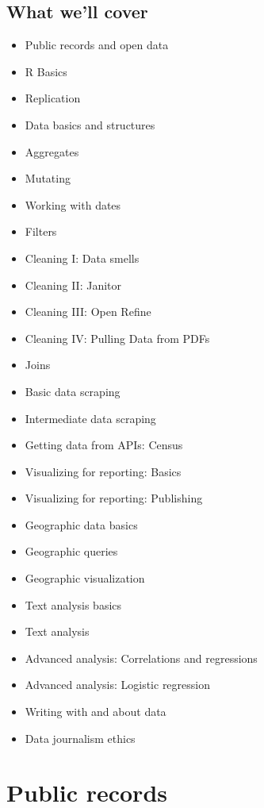 \documentclass[]{book}
\providecommand{\tightlist}{%
  \setlength{\itemsep}{0pt}\setlength{\parskip}{0pt}}
\begin{document}
\hypertarget{what-well-cover}{%
\section{What we'll cover}\label{what-well-cover}}

\begin{itemize}
\tightlist
\item
  Public records and open data
\item
  R Basics
\item
  Replication
\item
  Data basics and structures
\item
  Aggregates
\item
  Mutating
\item
  Working with dates
\item
  Filters
\item
  Cleaning I: Data smells
\item
  Cleaning II: Janitor
\item
  Cleaning III: Open Refine
\item
  Cleaning IV: Pulling Data from PDFs
\item
  Joins
\item
  Basic data scraping
\item
  Intermediate data scraping
\item
  Getting data from APIs: Census
\item
  Visualizing for reporting: Basics
\item
  Visualizing for reporting: Publishing
\item
  Geographic data basics
\item
  Geographic queries
\item
  Geographic visualization
\item
  Text analysis basics
\item
  Text analysis
\item
  Advanced analysis: Correlations and regressions
\item
  Advanced analysis: Logistic regression
\item
  Writing with and about data
\item
  Data journalism ethics
\end{itemize}

\hypertarget{public-records}{%
\chapter{Public records}\label{public-records}}
\end{document}
